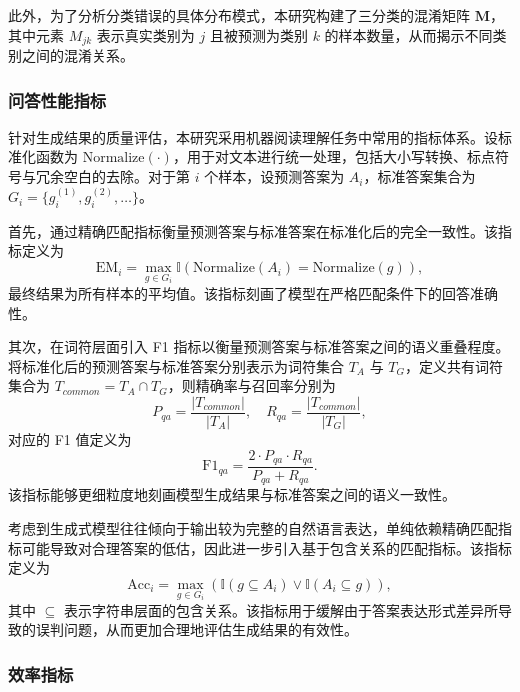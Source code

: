 
此外，为了分析分类错误的具体分布模式，本研究构建了三分类的混淆矩阵 $\mathbf{M}$，其中元素 $M_{jk}$ 表示真实类别为 $j$ 且被预测为类别 $k$ 的样本数量，从而揭示不同类别之间的混淆关系。

\subsubsection{问答性能指标}

针对生成结果的质量评估，本研究采用机器阅读理解任务中常用的指标体系。设标准化函数为 $\text{Normalize}(\cdot)$，用于对文本进行统一处理，包括大小写转换、标点符号与冗余空白的去除。对于第 $i$ 个样本，设预测答案为 $A_i$，标准答案集合为 $G_i=\{g_i^{(1)}, g_i^{(2)}, \ldots\}$。

首先，通过精确匹配指标衡量预测答案与标准答案在标准化后的完全一致性。该指标定义为
\begin{equation}
\text{EM}_i = \max_{g \in G_i} \mathbb{I}(\text{Normalize}(A_i) = \text{Normalize}(g)),
\end{equation}
最终结果为所有样本的平均值。该指标刻画了模型在严格匹配条件下的回答准确性。

其次，在词符层面引入 F1 指标以衡量预测答案与标准答案之间的语义重叠程度。将标准化后的预测答案与标准答案分别表示为词符集合 $T_A$ 与 $T_G$，定义共有词符集合为 $T_{common}=T_A \cap T_G$，则精确率与召回率分别为
\begin{equation}
P_{qa} = \frac{|T_{common}|}{|T_A|}, \quad R_{qa} = \frac{|T_{common}|}{|T_G|},
\end{equation}
对应的 F1 值定义为
\begin{equation}
\text{F1}_{qa} = \frac{2 \cdot P_{qa} \cdot R_{qa}}{P_{qa} + R_{qa}}.
\end{equation}
该指标能够更细粒度地刻画模型生成结果与标准答案之间的语义一致性。

考虑到生成式模型往往倾向于输出较为完整的自然语言表达，单纯依赖精确匹配指标可能导致对合理答案的低估，因此进一步引入基于包含关系的匹配指标。该指标定义为
\begin{equation}
\text{Acc}_i = \max_{g \in G_i} \left( \mathbb{I}(g \subseteq A_i) \lor \mathbb{I}(A_i \subseteq g) \right),
\end{equation}
其中 $\subseteq$ 表示字符串层面的包含关系。该指标用于缓解由于答案表达形式差异所导致的误判问题，从而更加合理地评估生成结果的有效性。

\subsubsection{效率指标}

